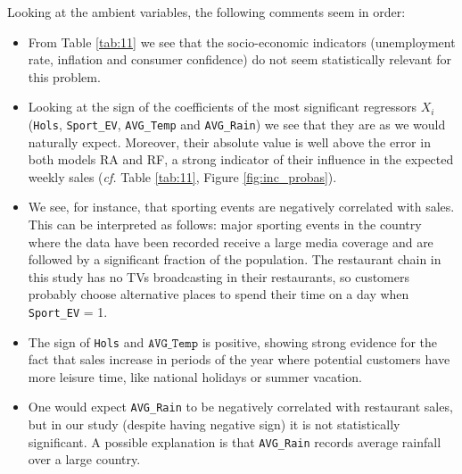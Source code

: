 
Looking at the ambient variables, the following comments seem in order:
\begin{itemize}

\item From Table \ref{tab:11} we see that the socio-economic indicators (unemployment rate, inflation and consumer confidence) do not seem statistically relevant for this problem. 

\item Looking at the sign of the coefficients of the most significant regressors $X_i$ (\texttt{Hols}, \texttt{Sport\_EV}, \texttt{AVG\_Temp} and \texttt{AVG\_Rain}) we see that they are as we would naturally expect. Moreover, their absolute value is well above the error in both models RA and RF, a strong indicator of their influence in the expected weekly sales (\emph{cf.} Table \ref{tab:11}, Figure \ref{fig:inc_probas}). 

\item We see, for instance, that sporting events are negatively correlated with sales. This can be interpreted as follows: major sporting events in the country where the data have been recorded receive a large media coverage and are followed by a significant fraction of the population. The restaurant chain in this study has no TVs broadcasting in their restaurants, so customers probably choose alternative places to spend their time on a day when \texttt{Sport\_EV} = 1. 

\item The sign of \texttt{Hols} and $\texttt{AVG\_Temp}$ is positive, showing strong evidence for the fact that sales increase in periods of the year where potential customers have more leisure time, like national holidays or  summer vacation. 

\item One would expect \texttt{AVG\_Rain} to be negatively correlated with restaurant sales, but in our study (despite having negative sign) it is not statistically significant. A possible explanation is that \texttt{AVG\_Rain} records average rainfall over a large country. %

\end{itemize}

